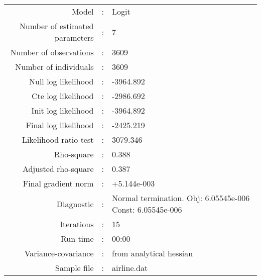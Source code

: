 

\begin{flushleft}
\begin{tabular}{rcl}
\hline
Model &:& Logit\\
Number of estimated parameters&:&7\\
Number of  observations &:& 3609\\
Number of individuals&:&3609\\
Null log likelihood&:&-3964.892\\
Cte log likelihood&:&-2986.692\\
Init log likelihood&:&-3964.892\\
Final log likelihood&:&-2425.219\\
Likelihood ratio test &:&3079.346\\
Rho-square&:&0.388\\
Adjusted rho-square&:&0.387\\
Final gradient norm&:&+5.144e-003\\
Diagnostic&:&Normal termination. Obj: 6.05545e-006 Const: 6.05545e-006\\
Iterations&:&15\\
Run time&:&00:00\\
Variance-covariance&:&from analytical hessian
\\
Sample file&:&airline.dat\\
\end{tabular}
\end{flushleft}
